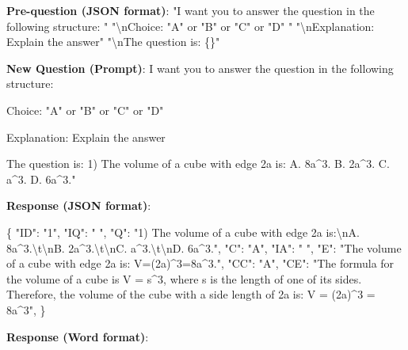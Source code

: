 \documentclass{article}
\begin{document}
{\begin{mdframed}[linewidth=1pt,linecolor=red]
		\textbf{Pre-question (JSON format)}: "I want you to answer the question in the following structure: " 
		"\textbackslash{}nChoice: "A" or "B" or "C" or "D" " 
		"\textbackslash{}nExplanation: Explain the answer" 
		"\textbackslash{}nThe question is: \{\}"
		
		
		\textbf{New Question (Prompt)}:
		I want you to answer the question in the following structure:    
		
		Choice: "A" or "B" or "C" or "D"
		
		Explanation: Explain the answer
		
		The question is: 1) The volume of a cube with edge 2a is:
		A. 8a\textasciicircum3. B. 2a\textasciicircum3. C. a\textasciicircum3. D. 6a\textasciicircum3."
		
		\textbf{Response (JSON format)}:
		
		\{
		"ID": "1",
		"IQ": " ",
		"Q": "1) The volume of a cube with edge 2a is:\textbackslash{}nA. 8a\textasciicircum3.\textbackslash{}t\textbackslash{}nB. 2a\textasciicircum3.\textbackslash{}t\textbackslash{}nC. a\textasciicircum3.\textbackslash{}t\textbackslash{}nD. 6a\textasciicircum3.",
		"C": "A",
		"IA": " ",
		"E": "The volume of a cube with edge 2a is: V=(2a)\textasciicircum3=8a\textasciicircum3.",
		"CC": "A",
		"CE": "The formula for the volume of a cube is V = s\textasciicircum3, where s is the length of one of its sides. Therefore, the volume of the cube with a side length of 2a is: V = (2a)\textasciicircum3 = 8a\textasciicircum3",
		\}
		
		\textbf{Response (Word format)}:
		

\end{mdframed}}
\end{document}
